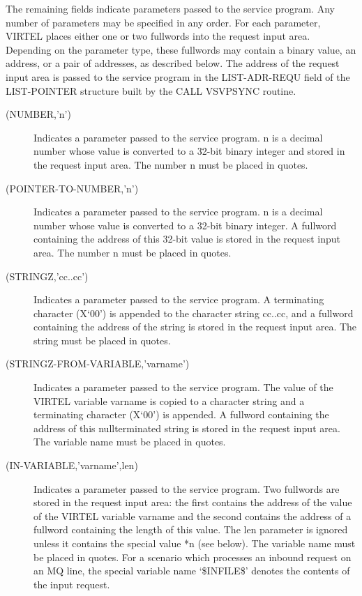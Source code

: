 \documentclass[letterpaper,10pt,english]{sphinxmanual}
\begin{document}
The remaining fields indicate parameters passed to the service program. Any number of parameters may be specified
in any order. For each parameter, VIRTEL places either one or two fullwords into the request input area. Depending on
the parameter type, these fullwords may contain a binary value, an address, or a pair of addresses, as described below.
The address of the request input area is passed to the service program in the LIST-ADR-REQU field of the LIST-POINTER
structure built by the CALL VSVPSYNC routine.
\begin{description}
\item[{(NUMBER,’n’)}] \leavevmode
Indicates a parameter passed to the service program. n is a decimal number whose value is converted to a 32-bit binary integer and stored in the request input area. The number n must be placed in quotes.

\item[{(POINTER-TO-NUMBER,’n’)}] \leavevmode
Indicates a parameter passed to the service program. n is a decimal number whose value is converted to a 32-bit binary integer. A fullword containing the address of this 32-bit value is stored in the request input area. The number n must be placed in quotes.

\item[{(STRINGZ,’cc..cc’)}] \leavevmode
Indicates a parameter passed to the service program. A terminating character (X‘00’) is appended to the character string cc..cc, and a fullword containing the address of the string is stored in the request input area. The string must be placed in quotes.

\item[{(STRINGZ-FROM-VARIABLE,’varname’)}] \leavevmode
Indicates a parameter passed to the service program. The value of the VIRTEL variable varname is copied to a character string and a terminating character (X‘00’) is appended. A fullword containing the address of this nullterminated string is stored in the request input area. The variable name must be placed in quotes.

\item[{(IN-VARIABLE,’varname’,len)}] \leavevmode
Indicates a parameter passed to the service program. Two fullwords are stored in the request input area: the first contains the address of the value of the VIRTEL variable varname and the second contains the address of a fullword containing the length of this value. The len parameter is ignored unless it contains the special value *n (see below). The variable name must be placed in quotes. For a scenario which processes an inbound request on an MQ line, the special variable name ‘\$INFILE\$’ denotes the contents of the input request.


\end{description}
\end{document}
